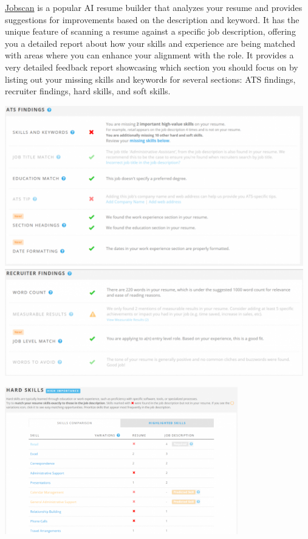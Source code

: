 \documentclass[
]{book}
\begin{document}
\href{https://www.jobscan.co/resume-score}{Jobscan} is a popular AI resume builder that analyzes your resume and provides suggestions for improvements based on the description and keyword. It has the unique feature of scanning a resume against a specific job description, offering you a detailed report about how your skills and experience are being matched with areas where you can enhance your alignment with the role. It provides a very detailed feedback report showcasing which section you should focus on by listing out your missing skills and keywords for several sections: ATS findings, recruiter findings, hard skills, and soft skills.

\includegraphics[width=5.11458in,height=\textheight]{Jobscan findings.png}

\includegraphics[width=3.98958in,height=\textheight]{Jobscan findings 2.png}
\end{document}
